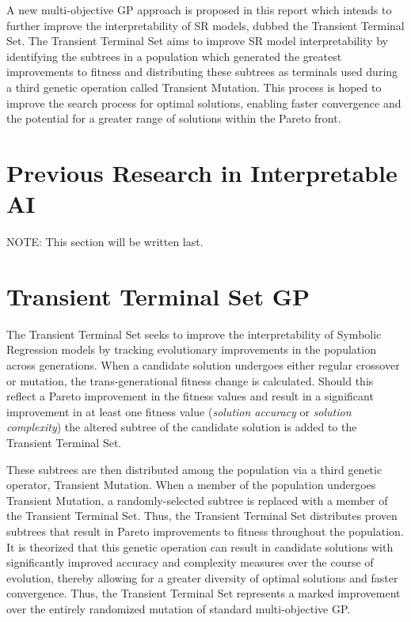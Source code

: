 \documentclass[a4paper, twocolumn]{article}
\begin{document}
A new multi-objective GP approach is proposed in this report which intends to further improve the interpretability of SR models, dubbed the Transient Terminal Set. The Transient Terminal Set aims to improve SR model interpretability by identifying the subtrees in a population which generated the greatest improvements to fitness and distributing these subtrees as terminals used during a third genetic operation called Transient Mutation. This process is hoped to improve the search process for optimal solutions, enabling faster convergence and the potential for a greater range of solutions within the Pareto front.

\section{Previous Research in Interpretable AI}
NOTE: This section will be written last.\cite{3}\cite{4}\cite{5}

\section{Transient Terminal Set GP}
The Transient Terminal Set seeks to improve the interpretability of Symbolic Regression models by tracking evolutionary improvements in the population across generations. When a candidate solution undergoes either regular crossover or mutation, the trans-generational fitness change is calculated. Should this reflect a Pareto improvement in the fitness values and result in a significant improvement in at least one fitness value (\textit{solution accuracy} or \textit{solution complexity}) the altered subtree of the candidate solution is added to the Transient Terminal Set.

These subtrees are then distributed among the population via a third genetic operator, Transient Mutation. When a member of the population undergoes Transient Mutation, a randomly-selected subtree is replaced with a member of the Transient Terminal Set. Thus, the Transient Terminal Set distributes proven subtrees that result in Pareto improvements to fitness throughout the population. It is theorized that this genetic operation can result in candidate solutions with significantly improved accuracy and complexity measures over the course of evolution, thereby allowing for a greater diversity of optimal solutions and faster convergence. Thus, the Transient Terminal Set represents a marked improvement over the entirely randomized mutation of standard multi-objective GP. 
\end{document}
